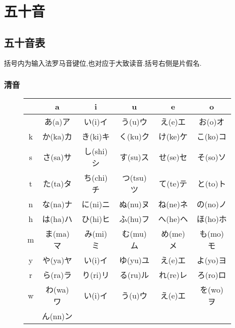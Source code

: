 
\usepackage{../../lectures_preamble}


    \section{五十音}
        \subsection{五十音表}
        括号内为输入法罗马音键位,也对应于大致读音.括号右侧是片假名.
        \subsubsection{清音}
        \begin{figure}[htbp]
            \centering
            \begin{tabular}{c||c|c|c|c|c}
                 & a & i & u & e & o\\\hline\hline
                 & あ(a)ア & い(i)イ & う(u)ウ & え(e)エ & お(o)オ\\\hline
                k & か(ka)カ & き(ki)キ & く(ku)ク & け(ke)ケ & こ(ko)コ\\\hline
                s & さ(sa)サ & し(shi)シ & す(su)ス & せ(se)セ & そ(so)ソ\\\hline
                t & た(ta)タ & ち(chi)チ & つ(tsu)ツ & て(te)テ & と(to)ト\\\hline
                n & な(na)ナ & に(ni)ニ & ぬ(nu)ヌ & ね(ne)ネ & の(no)ノ\\\hline
                h & は(ha)ハ & ひ(hi)ヒ & ふ(hu)フ & へ(he)ヘ & ほ(ho)ホ\\\hline
                m & ま(ma)マ & み(mi)ミ & む(mu)ム & め(me)メ & も(mo)モ\\\hline
                y & や(ya)ヤ & い(i)イ & ゆ(yu)ユ & え(e)エ & よ(yo)ヨ\\\hline
                r & ら(ra)ラ & り(ri)リ & る(ru)ル & れ(re)レ & ろ(ro)ロ\\\hline
                w & わ(wa)ワ & い(i)イ & う(u)ウ & え(e)エ & を(wo)ヲ\\\hline
                 & ん(nn)ン
            \end{tabular}
        \end{figure}
